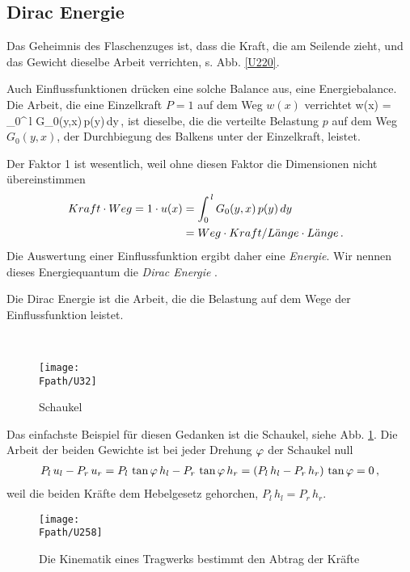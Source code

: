 {\textcolor{sectionTitleBlue}{\section{Dirac Energie}}}
Das Geheimnis des Flaschenzuges ist, dass die Kraft, die am Seilende zieht, und das Gewicht dieselbe Arbeit verrichten, s. Abb. \ref{U220}.

Auch Einflussfunktionen dr\"{u}cken eine solche Balance aus, eine Energiebalance. Die Arbeit, die eine Einzelkraft $P = 1$
auf dem Weg $w(x)$ verrichtet
 \cdot w(x) = \int_0^{\,l}  G_0(y,x)\,p(y)\,dy\,,
\eeq
ist dieselbe, die die verteilte Belastung $p$ auf dem Weg $G_0(y,x)$, der Durchbiegung des Balkens unter der Einzelkraft, leistet.

Der Faktor 1 ist wesentlich, weil ohne diesen Faktor die Dimensionen nicht \"{u}bereinstimmen
\begin{align}
\!\!\!\!\!Kraft \cdot Weg =  1 \cdot u(x) &= \int_0^{\,l} G_0(y, x)\,p(y)\,dy \nonumber \\
&= Weg \cdot Kraft/L\ddot{a}nge \cdot L\ddot{a}nge\,.
\end{align}
Die Auswertung einer Einflussfunktion ergibt daher eine {\em Energie\/}. Wir nennen dieses Energiequantum die {\em Dirac Energie\/}
.\\

\hspace*{-12pt}\colorbox{highlightBlue}{\parbox{0.98\textwidth}{Die Dirac Energie ist die Arbeit, die die Belastung auf dem Wege der Einflussfunktion leistet.}}\\

\begin{figure}[tbp]
\centering
\if {} \sidecaption \fi
\texttt{[image: \\Fpath/U32]}
\caption{Schaukel} \label{U32}
\end{figure}%

Das einfachste Beispiel f\"{u}r diesen Gedanken ist die Schaukel, siehe Abb. \ref{U32}. Die Arbeit der beiden Gewichte ist bei jeder Drehung $\varphi$ der Schaukel null
\begin{align}
P_l \, u_l - P_r \, u_r = P_l \,\tan \varphi \, h_l - P_r \, \tan \varphi \, h_r
= (P_l \, h_l - P_r \, h_r) \,\tan \varphi  = 0\,,
\end{align}
weil die beiden Kr\"{a}fte dem Hebelgesetz gehorchen, $P_l \, h_l = P_r \, h_r$.
\begin{figure}[tbp]
\centering
\if {} \sidecaption \fi
\texttt{[image: \\Fpath/U258]}
\caption{Die Kinematik eines Tragwerks bestimmt den Abtrag der Kr\"{a}fte} \label{U258}
\end{figure}%

